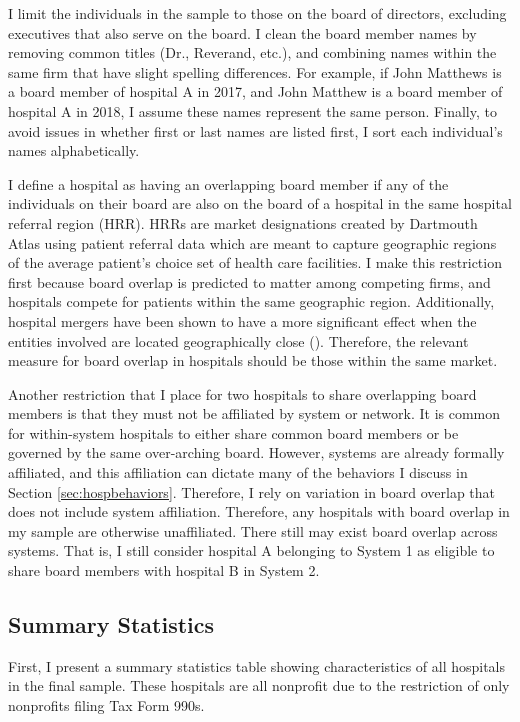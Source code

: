 \documentclass[12pt]{article}
\begin{document}
    I limit the individuals in the sample to those on the board of directors, excluding executives that also serve on the board. I clean the board member names by removing common titles (Dr., Reverand, etc.), and combining names within the same firm that have slight spelling differences. For example, if John Matthews is a board member of hospital A in 2017, and John Matthew is a board member of hospital A in 2018, I assume these names represent the same person. Finally, to avoid issues in whether first or last names are listed first, I sort each individual's names alphabetically. 

    I define a hospital as having an overlapping board member if any of the individuals on their board are also on the board of a hospital in the same hospital referral region (HRR). HRRs are market designations created by Dartmouth Atlas using patient referral data which are meant to capture geographic regions of the average patient's choice set of health care facilities. I make this restriction first because board overlap is predicted to matter among competing firms, and hospitals compete for patients within the same geographic region. Additionally, hospital mergers have been shown to have a more significant effect when the entities involved are located geographically close (\cite{cooper2019price}). Therefore, the relevant measure for board overlap in hospitals should be those within the same market. 

    Another restriction that I place for two hospitals to share overlapping board members is that they must not be affiliated by system or network. It is common for within-system hospitals to either share common board members or be governed by the same over-arching board. However, systems are already formally affiliated, and this affiliation can dictate many of the behaviors I discuss in Section \ref{sec:hospbehaviors}. Therefore, I rely on variation in board overlap that does not include system affiliation. Therefore, any hospitals with board overlap in my sample are otherwise unaffiliated. There still may exist board overlap across systems. That is, I still consider hospital A belonging to System 1 as eligible to share board members with hospital B in System 2. 


    \subsection{Summary Statistics}

    First, I present a summary statistics table showing characteristics of all hospitals in the final sample. These hospitals are all nonprofit due to the restriction of only nonprofits filing Tax Form 990s. 
\end{document}
